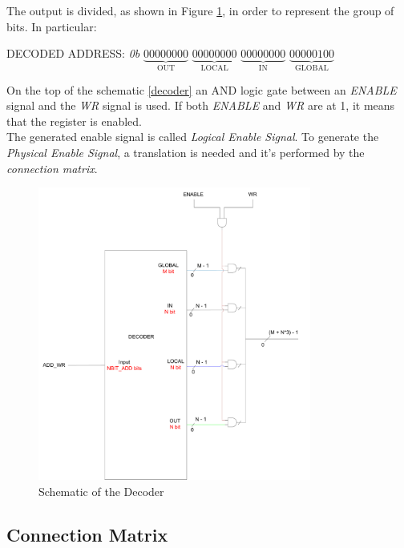 The output is divided, as shown in Figure \ref{decoder}, in order to represent the group of bits. In particular: 

\begin{center}
	DECODED ADDRESS: \emph{0b} $\underbrace{00000000}_{\text{OUT}}$ $\underbrace{00000000}_{\text{LOCAL}}$ $\underbrace{00000000}_{\text{IN}}$ $\underbrace{00000100}_{\text{GLOBAL}}$
\end{center}

On the top of the schematic \autoref{decoder} an AND logic gate between an \emph{ENABLE} signal and the \emph{WR} signal is used. If both \emph{ENABLE} and \emph{WR} are at 1, it means that the register is enabled.\\

The generated enable signal is called \emph{Logical Enable Signal}. To generate the \emph{Physical Enable Signal}, a translation is needed and it's performed by the \emph{connection matrix}.

\begin{figure}[H]
    \centering
    \includegraphics[width=0.8\textwidth]{chapters/4_DecodeStage/images/Decoder.pdf}
    \caption{Schematic of the Decoder}
    \label{decoder}
\end{figure}

\subsection{Connection Matrix}

